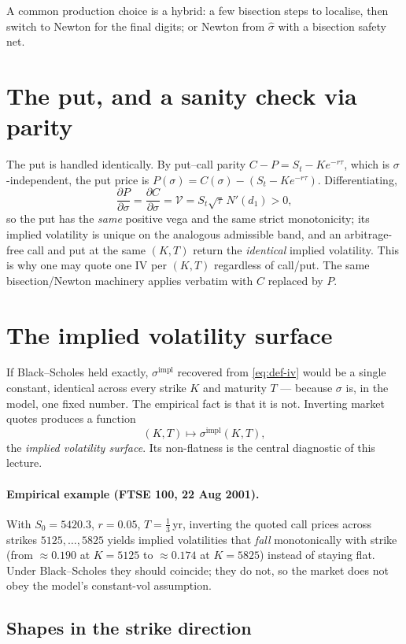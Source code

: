 \documentclass[11pt]{article}
\newcommand{\impl}{\mathrm{impl}}
\newcommand{\Vega}{\mathcal{V}}
\begin{document}
A common production choice is a hybrid: a few bisection steps to localise, then switch to Newton
for the final digits; or Newton from $\hat\sigma$ with a bisection safety net.

\section{The put, and a sanity check via parity}\label{sec:put}

The put is handled identically. By put--call parity $C-P=S_t-Ke^{-r\tau}$, which is
$\sigma$-independent, the put price is $P(\sigma)=C(\sigma)-(S_t-Ke^{-r\tau})$. Differentiating,
\[
\frac{\partial P}{\partial\sigma}=\frac{\partial C}{\partial\sigma}=\Vega=S_t\sqrt\tau\,N'(d_1)>0,
\]
so the put has the \emph{same} positive vega and the same strict monotonicity; its implied
volatility is unique on the analogous admissible band, and an arbitrage-free call and put at the
same $(K,T)$ return the \emph{identical} implied volatility. This is why one may quote one IV per
$(K,T)$ regardless of call/put. The same bisection/Newton machinery applies verbatim with $C$
replaced by $P$.

\section{The implied volatility surface}

If Black--Scholes held exactly, $\sigma^{\impl}$ recovered from \eqref{eq:def-iv} would be a single
constant, identical across every strike $K$ and maturity $T$ --- because $\sigma$ is, in the model,
one fixed number. The empirical fact is that it is not. Inverting market quotes produces a function
\[
(K,T)\longmapsto\sigma^{\impl}(K,T),
\]
the \emph{implied volatility surface}. Its non-flatness is the central diagnostic of this lecture.

\paragraph{Empirical example (FTSE 100, 22 Aug 2001).} With $S_0=5420.3$, $r=0.05$,
$T=\tfrac13$\,yr, inverting the quoted call prices across strikes $5125,\dots,5825$ yields implied
volatilities that \emph{fall} monotonically with strike (from $\approx0.190$ at $K=5125$ to
$\approx0.174$ at $K=5825$) instead of staying flat. Under Black--Scholes they should coincide;
they do not, so the market does not obey the model's constant-vol assumption.

\subsection{Shapes in the strike direction}
\end{document}
